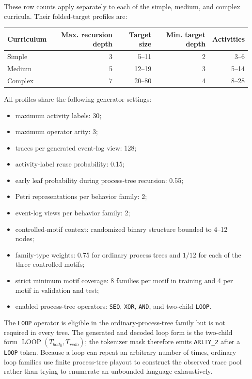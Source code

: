 \documentclass[manuscript,screen,nonacm]{acmart}
\begin{document}
These row counts apply separately to each of the simple, medium, and complex
curricula. Their folded-target profiles are:
\begin{center}
\small
\begin{tabular}{lrrrr}
\toprule
Curriculum & Max. recursion depth & Target size & Min. target depth & Activities \\
\midrule
Simple  & 3 & 5--11  & 2 & 3--6 \\
Medium  & 5 & 12--19 & 3 & 5--14 \\
Complex & 7 & 20--80 & 4 & 8--28 \\
\bottomrule
\end{tabular}
\end{center}
All profiles share the following generator settings:
\begin{itemize}
  \item maximum activity labels: 30;
  \item maximum operator arity: 3;
  \item traces per generated event-log view: 128;
  \item activity-label reuse probability: 0.15;
  \item early leaf probability during process-tree recursion: 0.55;
  \item Petri representations per behavior family: 2;
  \item event-log views per behavior family: 2;
  \item controlled-motif context: randomized binary structure bounded to 4--12 nodes;
  \item family-type weights: 0.75 for ordinary process trees and $1/12$ for
        each of the three controlled motifs;
  \item strict minimum motif coverage: 8 families per motif in training and
        4 per motif in validation and test;
  \item enabled process-tree operators: \texttt{SEQ}, \texttt{XOR},
        \texttt{AND}, and two-child \texttt{LOOP}.
\end{itemize}
The \texttt{LOOP} operator is eligible in the ordinary-process-tree family but
is not required in every tree. The
generated and decoded loop form is the two-child form
$\operatorname{LOOP}(T_{\mathit{body}},T_{\mathit{redo}})$; the tokenizer mask
therefore emits \texttt{ARITY\_2} after a \texttt{LOOP} token. Because a loop
can repeat an arbitrary number of times, ordinary loop families use finite
process-tree playout to construct the observed trace pool rather than trying to
enumerate an unbounded language exhaustively.
\end{document}
